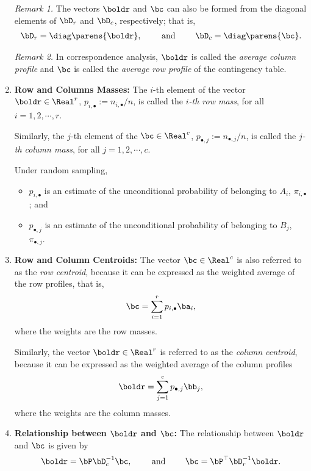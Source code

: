 \documentclass[12pt]{article}
\begin{document}
\begin{enumerate}[label=\textbf{\arabic*.}]
	\textit{Remark 1.} The vectors $\boldr$ and $\bc$ can also be formed from the diagonal elements of $\bD_r$ and $\bD_c$, respectively; that is, 
	\begin{align*}
		\bD_r = \diag \parens{\boldr}, \qquad \text{ and } \qquad \bD_c = \diag \parens{\bc}. 
	\end{align*}
	
	\textit{Remark 2.} In correspondence analysis, $\boldr$ is called the \emph{average column profile} and $\bc$ is called the \emph{average row profile} of the contingency table. 
	
	\item \textbf{Row and Columns Masses:} The $i$-th element of the vector $\boldr \in \Real^r$, $p_{i,\bullet} := n_{i,\bullet} / n$, is called the \emph{$i$-th row mass}, for all $i = 1, 2, \cdots, r$. 
	
	Similarly, the $j$-th element of the $\bc \in \Real^c$, $p_{\bullet,j} := n_{\bullet,j}/n$, is called the \emph{$j$-th column mass}, for all $j = 1, 2, \cdots, c$. 
	
	Under random sampling, 
	\begin{itemize}
		\item $p_{i,\bullet}$ is an estimate of the unconditional probability of belonging to $A_i$, $\pi_{i, \bullet}$; and 
		\item $p_{\bullet, j}$ is an estimate of the unconditional probability of belonging to $B_j$, $\pi_{\bullet, j}$. 
	\end{itemize}
	
	\item \textbf{Row and Column Centroids:} The vector $\bc \in \Real^c$ is also referred to as the \emph{row centroid}, because it can be expressed as the weighted average of the row profiles, that is, 
	\begin{align*}
		\bc = \sum_{i=1}^r p_{i,\bullet} \ba_i, 
	\end{align*}
	where the weights are the row masses. 
	
	Similarly, the vector $\boldr \in \Real^r$ is referred to as the \emph{column centroid}, because it can be expressed as the weighted average of the column profiles 
	\begin{align*}
		\boldr = \sum_{j=1}^c p_{\bullet,j} \bb_j, 
	\end{align*}
	where the weights are the column masses. 
	
	\item \textbf{Relationship between $\boldr$ and $\bc$:} The relationship between $\boldr$ and $\bc$ is given by 
	\begin{align*}
		\boldr = \bP \bD^{-1}_c \bc, \qquad \text{ and } \qquad \bc = \bP^\top \bD^{-1}_r \boldr. 
	\end{align*}
	

\end{enumerate}
\end{document}
